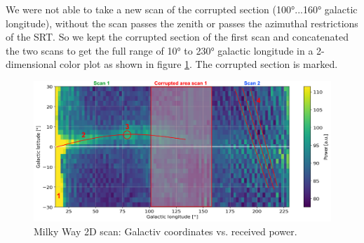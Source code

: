 We were not able to take a new scan of the corrupted section (100°...160° galactic longitude), without the scan passes the zenith or passes the azimuthal restrictions of the SRT. So we kept the corrupted section of the first scan and concatenated the two scans to get the full range of 10° to 230° galactic longitude in a 2-dimensional color plot as shown in figure \ref{fig:mw_2d_plot}. The corrupted section is marked.

\pagebreak

\begin{figure}[H]
    \centering
    \includegraphics[width=\textwidth]{assets/mw2d_powermap_edit.png}
    \caption{Milky Way 2D scan: Galactiv coordinates vs. received power.}
    \label{fig:mw_2d_plot}
\end{figure}

